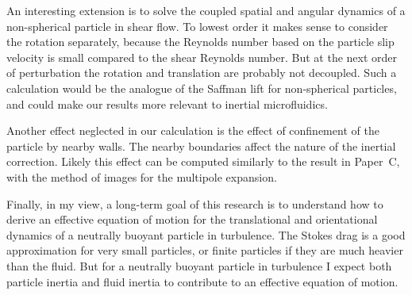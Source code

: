 \documentclass[thesis.tex]{subfiles}
\begin{document}
An interesting extension is to solve the coupled spatial and angular dynamics of a non-spherical particle in shear flow. To lowest order it makes sense to consider the rotation separately, because the Reynolds number based on the particle slip velocity is small compared to the shear Reynolds number. But at the next order of perturbation the rotation and translation are probably not decoupled. Such a calculation would be the analogue of the Saffman lift for non-spherical particles, and could make our results more relevant to inertial microfluidics.

Another effect neglected in our calculation is the effect of confinement of the particle by nearby walls. The nearby boundaries affect the nature of the inertial correction. Likely this effect can be computed similarly to the result in Paper~C, with the method of images for the multipole expansion.

Finally, in my view, a long-term goal of this research is to understand how to derive an effective equation of motion for the translational and orientational dynamics of a neutrally buoyant particle in turbulence. The Stokes drag is a good approximation for very small particles, or finite particles if they are much heavier than the fluid. But for a neutrally buoyant particle in turbulence I expect both particle inertia and fluid inertia to contribute to an effective equation of motion.
\end{document}
